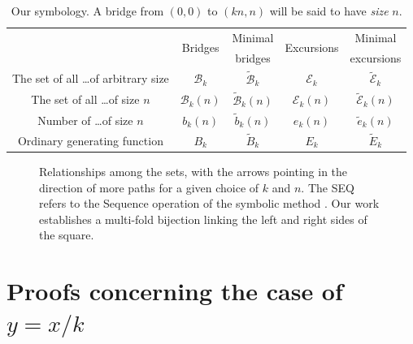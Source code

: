 \documentclass[10pt]{article}
\newcommand{\seq}[0]{\operatorname{SEQ}}
\begin{document}
\begin{table}[h]
\centering
\begin{tabular}{|c||c|c|c|c|} \hline
    & \multirow{2}{*}{Bridges} & Minimal & \multirow{2}{*}{Excursions} & Minimal \\
    &         & bridges &            & excursions \\\hline\hline
\rule{0pt}{12pt} The set of all \ldots of arbitrary size & $\mathcal{B}_k$ & $\widetilde{\mathcal{B}}_k$ & $\mathcal{E}_k$ & $\widetilde{\mathcal{E}}_k$ \\\hline
\rule{0pt}{12pt} The set of all \ldots of size $n$ & $\mathcal{B}_k(n)$ & $\widetilde{\mathcal{B}}_k(n)$ & $\mathcal{E}_k(n)$ & $\widetilde{\mathcal{E}}_k(n)$ \\\hline
\rule{0pt}{12pt} Number of \ldots of size $n$ & $b_k(n)$ & $\widetilde{b}_k(n)$ & $e_k(n)$ & $\widetilde{e}_k(n)$ \\\hline
\rule{0pt}{12pt} Ordinary generating function & $B_k$ & $\widetilde{B}_k$ & $E_k$ & $\widetilde{E}_k$ \\\hline
\end{tabular}
\caption{Our symbology.  A bridge from $(0,0)$ to $(kn,n)$ will be said to have \emph{size} $n$.}
\label{SymbolTable}
\end{table}

\begin{figure}[H]
\centering
{}
\caption{Relationships among the sets, with the arrows pointing in the direction of more paths for a given choice of $k$ and $n$. The SEQ refers to the Sequence operation of the symbolic method \cite[\S I.2.1]{flajolet2009}. Our work establishes a multi-fold bijection linking the left and right sides of the square.} \label{fig:square}\end{figure}



\section{Proofs concerning the case of \texorpdfstring{$y=x/k$}{y=x/k}} \label{results}
\end{document}
